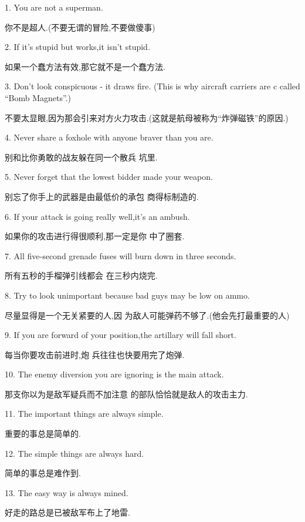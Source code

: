 \documentclass[12pt]{article}
\begin{document}
\setcounter{section}{0}
\pagestyle{fancy}
\fancyhead{}
\renewcommand{\headrulewidth}{0pt}


\begin{center}
\end{center}

\newcommand{\aarrule}[2]{%
\begin{minipage}{1\columnwidth}%
\vspace{1ex}
{\color{blue} #1}

{\small #2}
\vspace{1ex}
\end{minipage}
}

\aarrule{1. You are not a superman.}{你不是超人.(不要无谓的冒险,不要做傻事)}

\aarrule{2. If it's stupid but works,it isn't stupid.}{如果一个蠢方法有效,那它就不是一个蠢方法.}

\aarrule{3. Don't look conspicuous - it draws fire. (This is why aircraft carriers are c called
``Bomb Magnets''.)}{不要太显眼,因为那会引来对方火力攻击.(这就是航母被称为``炸弹磁铁''的原因.)}

\aarrule{4. Never share a foxhole with anyone braver than you are.}{别和比你勇敢的战友躲在同一个散兵
坑里.}

\aarrule{5. Never forget that the lowest bidder made your weapon.}{别忘了你手上的武器是由最低价的承包
商得标制造的.}

\aarrule{6. If your attack is going really well,it's an ambush.}{如果你的攻击进行得很顺利,那一定是你
中了圈套.}

\aarrule{7. All five-second grenade fuses will burn down in three seconds.}{所有五秒的手榴弹引线都会
在三秒内烧完.}

\aarrule{8. Try to look unimportant because bad guys may be low on ammo.}{尽量显得是一个无关紧要的人,因
为敌人可能弹药不够了.(他会先打最重要的人)}

\aarrule{9. If you are forward of your position,the artillary will fall short.}{每当你要攻击前进时,炮
兵往往也快要用完了炮弹.}

\aarrule{10. The enemy diversion you are ignoring is the main attack.}{那支你以为是敌军疑兵而不加注意
的部队恰恰就是敌人的攻击主力.}

\aarrule{11. The important things are always simple.}{重要的事总是简单的.}

\aarrule{12. The simple things are always hard.}{简单的事总是难作到.}

\aarrule{13. The easy way is always mined.}{好走的路总是已被敌军布上了地雷.}
\end{document}
